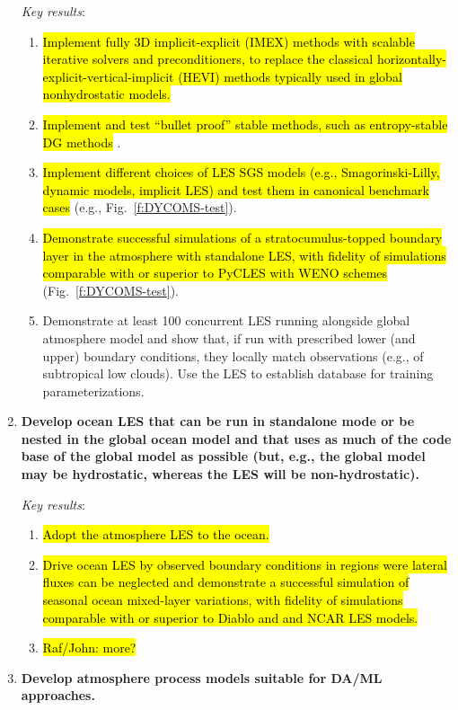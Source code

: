 \documentclass{article}
\newcommand{\hlg}[1]{{\sethlcolor{green}\hl{#1}}}
\begin{document}
\begin{enumerate}
    \emph{Key results}:
    \begin{enumerate}
        \item \hlg{Implement fully 3D implicit-explicit (IMEX) methods with scalable iterative solvers and preconditioners, to replace the classical horizontally-explicit-vertical-implicit (HEVI) methods typically used in global nonhydrostatic models.}
        \item \hlg{Implement and test ``bullet proof'' stable methods, such as entropy-stable DG methods} \citep[e.g.,][]{Chan18a}.
        \item \hlg{Implement different choices of LES SGS models (e.g., Smagorinski-Lilly, dynamic models, implicit LES) and test them in canonical benchmark cases} (e.g., Fig.~\ref{f:DYCOMS-test}).
        \item \hlg{Demonstrate successful simulations of a stratocumulus-topped boundary layer in the atmosphere with standalone LES, with fidelity of simulations comparable with or superior to PyCLES with WENO schemes} (Fig.~\ref{f:DYCOMS-test}). 
        \item Demonstrate at least 100 concurrent LES running alongside global atmosphere model and show that, if run with prescribed lower (and upper) boundary conditions, they locally match observations (e.g., of subtropical low clouds). Use the LES to establish database for training parameterizations.
    \end{enumerate}
   
   \item \textbf{Develop ocean LES that can be run in standalone mode or be nested in the global ocean model and that uses as much of the code base of the global model as possible (but, e.g., the global model may be hydrostatic, whereas the LES will be non-hydrostatic).}
 
    \emph{Key results}: 
    \begin{enumerate}
    \item \hlg{Adopt the atmosphere LES to the ocean.}
    \item \hlg{Drive ocean LES by observed boundary conditions in regions were lateral fluxes can be neglected and demonstrate a successful simulation of seasonal ocean mixed-layer variations,  with fidelity of simulations comparable with or superior to Diablo and and NCAR LES models.}
    \item \hl{Raf/John: more?}
\end{enumerate}
   
    \item \textbf{Develop atmosphere process models suitable for DA/ML approaches.}
    

\end{enumerate}
\end{document}
